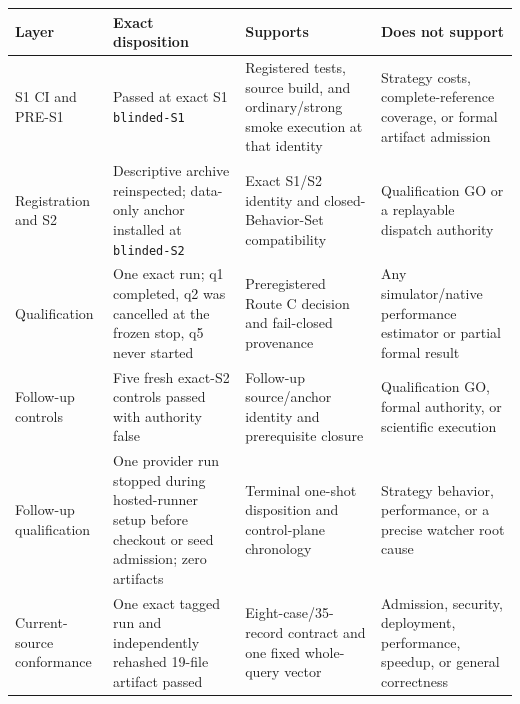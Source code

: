 {\def\LTcaptype{none} %
\begin{longtable}[]{@{}
  >{\raggedright\arraybackslash}p{}
  >{\raggedright\arraybackslash}p{}
  >{\raggedright\arraybackslash}p{}
  >{\raggedright\arraybackslash}p{}@{}}
\toprule\noalign{}
\begin{minipage}[b]{\linewidth}\raggedright
Layer
\end{minipage} & \begin{minipage}[b]{\linewidth}\raggedright
Exact disposition
\end{minipage} & \begin{minipage}[b]{\linewidth}\raggedright
Supports
\end{minipage} & \begin{minipage}[b]{\linewidth}\raggedright
Does not support
\end{minipage} \\
\midrule\noalign{}
\endhead
\bottomrule\noalign{}
\endlastfoot
S1 CI and PRE-S1 & Passed at exact S1 \texttt{blinded-S1} & Registered tests, source build, and ordinary/strong smoke execution at that identity & Strategy costs, complete-reference coverage, or formal artifact admission \\
Registration and S2 & Descriptive archive reinspected; data-only anchor installed at \texttt{blinded-S2} & Exact S1/S2 identity and closed-Behavior-Set compatibility & Qualification GO or a replayable dispatch authority \\
Qualification & One exact run; q1 completed, q2 was cancelled at the frozen stop, q5 never started & Preregistered Route C decision and fail-closed provenance & Any simulator/native performance estimator or partial formal result \\
Follow-up controls & Five fresh exact-S2 controls passed with authority false & Follow-up source/anchor identity and prerequisite closure & Qualification GO, formal authority, or scientific execution \\
Follow-up qualification & One provider run stopped during hosted-runner setup before checkout or seed admission; zero artifacts & Terminal one-shot disposition and control-plane chronology & Strategy behavior, performance, or a precise watcher root cause \\
Current-source conformance & One exact tagged run and independently rehashed 19-file artifact passed & Eight-case/35-record contract and one fixed whole-query vector & Admission, security, deployment, performance, speedup, or general correctness \\

\end{longtable}}
